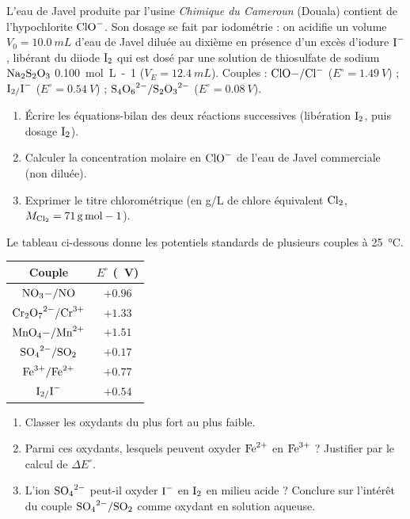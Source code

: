 \documentclass[11pt]{article}
\begin{document}
\begin{exercice}
L'eau de Javel produite par l'usine \textit{Chimique du Cameroun} (Douala) contient de l'hypochlorite $\ce{ClO-}$. Son dosage se fait par iodométrie : on acidifie un volume $V_0 = \SI{10.0}{mL}$ d'eau de Javel diluée au dixième en présence d'un excès d'iodure $\ce{I-}$, libérant du diiode $\ce{I2}$ qui est dosé par une solution de thiosulfate de sodium $\ce{Na2S2O3}$ \SI{0.100}{mol.L-1} ($V_E = \SI{12.4}{mL}$).
Couples : $\ce{ClO-/Cl-}$ ($E^\circ = \SI{1.49}{V}$) ; $\ce{I2/I-}$ ($E^\circ = \SI{0.54}{V}$) ; $\ce{S4O6^{2-}/S2O3^{2-}}$ ($E^\circ = \SI{0.08}{V}$).
\begin{enumerate}
    \item Écrire les équations-bilan des deux réactions successives (libération $\ce{I2}$, puis dosage $\ce{I2}$).
    \item Calculer la concentration molaire en $\ce{ClO-}$ de l'eau de Javel commerciale (non diluée).
    \item Exprimer le titre chlorométrique (en g/L de chlore équivalent $\ce{Cl2}$, $M_{\ce{Cl2}} = \SI{71}{g.mol-1}$).
\end{enumerate}
\end{exercice}

\begin{exercice}
Le tableau ci-dessous donne les potentiels standards de plusieurs couples à \SI{25}{\celsius}.

\begin{tabular}{cc}
\hline
Couple & $E^\circ$ (\SI{}{V}) \\
\hline
$\ce{NO3-/NO}$ & $+0.96$ \\
$\ce{Cr2O7^{2-}/Cr^{3+}}$ & $+1.33$ \\
$\ce{MnO4-/Mn^{2+}}$ & $+1.51$ \\
$\ce{SO4^{2-}/SO2}$ & $+0.17$ \\
$\ce{Fe^{3+}/Fe^{2+}}$ & $+0.77$ \\
$\ce{I2/I-}$ & $+0.54$ \\
\hline
\end{tabular}

\begin{enumerate}
    \item Classer les oxydants du plus fort au plus faible.
    \item Parmi ces oxydants, lesquels peuvent oxyder $\ce{Fe^{2+}}$ en $\ce{Fe^{3+}}$ ? Justifier par le calcul de $\Delta E^\circ$.
    \item L'ion $\ce{SO4^{2-}}$ peut-il oxyder $\ce{I-}$ en $\ce{I2}$ en milieu acide ? Conclure sur l'intérêt du couple $\ce{SO4^{2-}/SO2}$ comme oxydant en solution aqueuse.
\end{enumerate}
\end{exercice}
\end{document}
